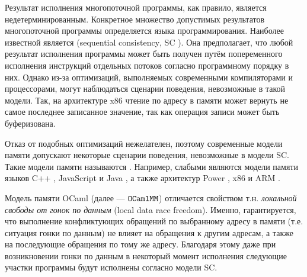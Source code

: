 Результат исполнения многопоточной программы, как правило, является недетерминированным. Конкретное множество допустимых результатов многопоточной программы определяется  языка программирования. Наиболее известной является    (\foreignlanguage{english}{sequential consistency}, SC \cite{sc}). Она предполагает, что любой результат исполнения программы может быть получен путём попеременного исполнения инструкций отдельных потоков согласно программному порядку в них. Однако из-за оптимизаций, выполняемых современными компиляторами и процессорами, могут наблюдаться сценарии поведения, невозможные в такой модели. Так, на архитектуре x86 чтение по адресу в памяти может вернуть не самое последнее записанное значение, так как операция записи может быть буферизована. 

Отказ от подобных оптимизаций нежелателен, поэтому современные модели памяти допускают некоторые сценарии поведения, невозможные в модели SC. Такие модели памяти называются . Например, слабыми являются модели памяти языков C++ \cite{cpp}, JavaScript \cite{js-mm} и Java \cite{jmm}, а также архитектур Power \cite{power}, x86 \cite{x86} и ARM \cite{arm}.



Модель памяти OCaml \cite{omm} (далее --- $\mathtt{OCaml}\allowbreak \mathtt{MM}$) отличается свойством т.н.  \textit{локальной свободы от гонок по данным} (local data race freedom). Именно, гарантируется, что выполнение конфликтующих обращений по выбранному адресу в памяти (т.е. ситуация гонки по данным) не влияет на обращения к другим адресам, а также на последующие обращения по тому же адресу. Благодаря этому даже при возникновении гонки по данным в некоторый момент исполнения следующие участки программы будут исполнены согласно модели SC. 

